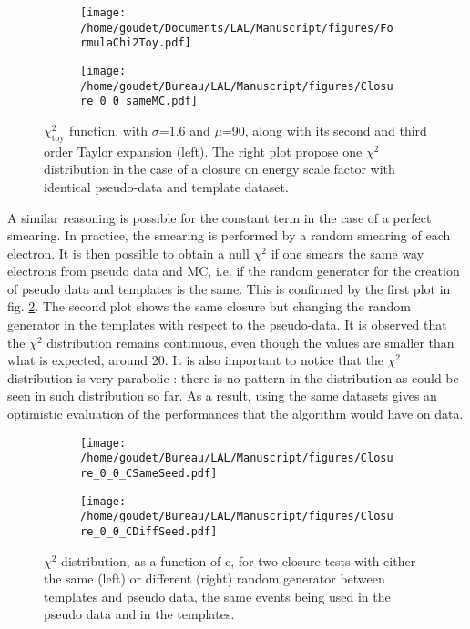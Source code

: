 \begin{enumerate}
\begin{figure}
\begin{subfigure}[t]{0.49\linewidth}
\begin{center}
\texttt{[image: /home/goudet/Documents/LAL/Manuscript/figures/FormulaChi2Toy.pdf]}
\end{center}
\end{subfigure}
\begin{subfigure}[t]{0.49\linewidth}
\begin{center}
\texttt{[image: /home/goudet/Bureau/LAL/Manuscript/figures/Closure\_0\_0\_sameMC.pdf]}
\end{center}
\end{subfigure}
\caption{\label{org0c951ba}
\(\chi^{\text{2}}_{\text{toy}}\) function, with \(\sigma\)=1.6 and \(\mu\)=90, along with its second and third order Taylor expansion (left). The right plot propose one $\chi^2$ distribution in the case of a closure on energy scale factor with identical pseudo-data and template dataset.}
\end{figure}

A similar reasoning is possible for the constant term in the case of a perfect smearing.
In practice, the smearing is performed by a random smearing of each electron.
It is then possible to obtain a null $\chi^2$ if one smears the same way electrons from pseudo data and MC, i.e. if the random generator for the creation of pseudo data and templates is the same.
This is confirmed by the first plot in fig. \ref{orgf0c9faa}.
The second plot shows the same closure but changing the random generator in the templates with respect to the pseudo-data.
It is observed that the $\chi^2$ distribution remains continuous, even though the values are smaller than what is expected, around 20.
It is also important to notice that the $\chi^2$ distribution is very parabolic : there is no pattern in the distribution as could be seen in such distribution so far.
As a result, using the same datasets gives an optimistic evaluation of the performances that the algorithm would have on data.


\begin{figure}
\begin{subfigure}[t]{0.49\linewidth}
\begin{center}
\texttt{[image: /home/goudet/Bureau/LAL/Manuscript/figures/Closure\_0\_0\_CSameSeed.pdf]}
\end{center}
\end{subfigure}
\begin{subfigure}[t]{0.49\linewidth}
\begin{center}
\texttt{[image: /home/goudet/Bureau/LAL/Manuscript/figures/Closure\_0\_0\_CDiffSeed.pdf]}
\end{center}
\end{subfigure}
\caption{\label{orgf0c9faa}
$\chi^2$ distribution, as a function of c, for two closure tests with either the same (left) or different (right) random generator between templates and pseudo data, the same events being used in the pseudo data and in the templates.}
\end{figure}





\end{enumerate}

